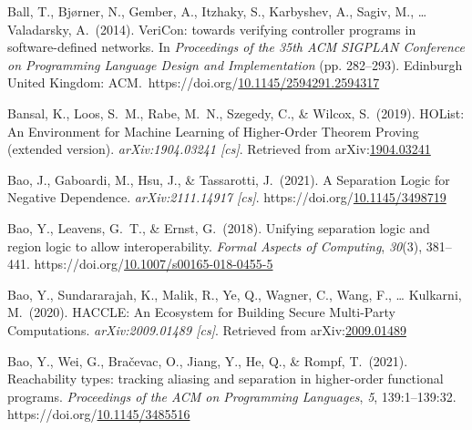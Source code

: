 \documentclass[12pt,twoside]{article}
\begin{document}
{\begin{thebibliography}{1079}
\mdbibitemlabel{}Ball, T., Bjørner, N., Gember, A., Itzhaky, S., Karbyshev, A., Sagiv, M., … Valadarsky, A.~(2014). VeriCon: towards verifying controller programs in software-defined networks. In \emph{Proceedings of the 35th ACM SIGPLAN Conference on Programming Language Design and Implementation} (pp. 282–293). Edinburgh United Kingdom: ACM.~https://doi.org/\href{https://dx.doi.org/10.1145/2594291.2594317}{10.1145/2594291.2594317}%

\mdbibitemlabel{}Bansal, K., Loos, S.~M., Rabe, M.~N., Szegedy, C., \& Wilcox, S.~(2019). HOList: An Environment for Machine Learning of Higher-Order Theorem Proving (extended version). \emph{arXiv:1904.03241 {}[cs]}. Retrieved from arXiv:\href{http://arxiv.org/abs/1904.03241}{1904.03241}%

\mdbibitemlabel{}Bao, J., Gaboardi, M., Hsu, J., \& Tassarotti, J.~(2021). A Separation Logic for Negative Dependence. \emph{arXiv:2111.14917 {}[cs]}. https://doi.org/\href{https://dx.doi.org/10.1145/3498719}{10.1145/3498719}%

\mdbibitemlabel{}Bao, Y., Leavens, G.~T., \& Ernst, G.~(2018). Unifying separation logic and region logic to allow interoperability. \emph{Formal Aspects of Computing}, \emph{30}(3), 381–441. https://doi.org/\href{https://dx.doi.org/10.1007/s00165-018-0455-5}{10.1007/s00165-018-0455-5}%

\mdbibitemlabel{}Bao, Y., Sundararajah, K., Malik, R., Ye, Q., Wagner, C., Wang, F., … Kulkarni, M.~(2020). HACCLE: An Ecosystem for Building Secure Multi-Party Computations. \emph{arXiv:2009.01489 {}[cs]}. Retrieved from arXiv:\href{http://arxiv.org/abs/2009.01489}{2009.01489}%

\mdbibitemlabel{}Bao, Y., Wei, G., Bračevac, O., Jiang, Y., He, Q., \& Rompf, T.~(2021). Reachability types: tracking aliasing and separation in higher-order functional programs. \emph{Proceedings of the ACM on Programming Languages}, \emph{5}, 139:1–139:32. https://doi.org/\href{https://dx.doi.org/10.1145/3485516}{10.1145/3485516}%


\end{thebibliography}}
\end{document}
